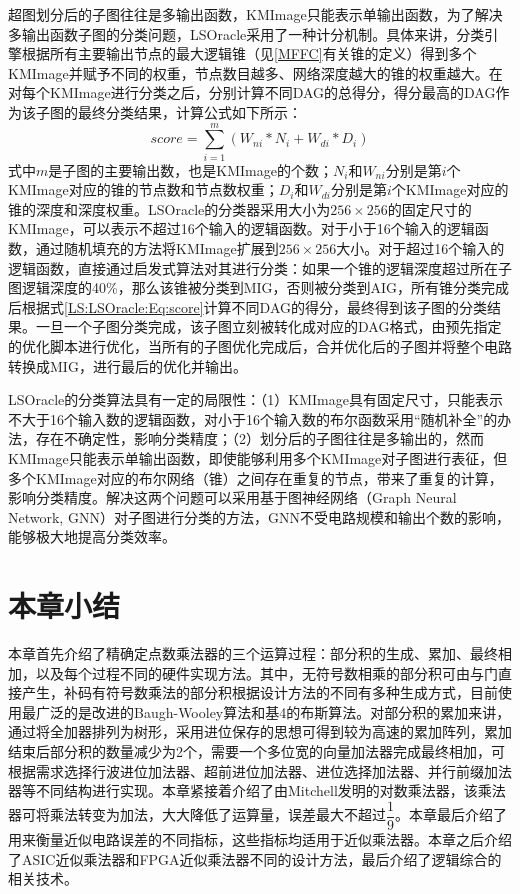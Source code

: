 超图划分后的子图往往是多输出函数，KMImage只能表示单输出函数，为了解决多输出函数子图的分类问题，LSOracle采用了一种计分机制。具体来讲，分类引擎根据所有主要输出节点的最大逻辑锥（见\ref{MFFC}有关锥的定义）得到多个KMImage并赋予不同的权重，节点数目越多、网络深度越大的锥的权重越大。在对每个KMImage进行分类之后，分别计算不同DAG的总得分，得分最高的DAG作为该子图的最终分类结果，计算公式如下所示：
\begin{equation}
\label{LS:LSOracle:Eq:score}
score = \sum_{i=1}^{m} ( W_{ni} * N_i +W_{di} *D_i )
\end{equation}
式中$m$是子图的主要输出数，也是KMImage的个数；$N_i$和$W_{ni}$分别是第$i$个KMImage对应的锥的节点数和节点数权重；$D_i$和$W_{di}$分别是第$i$个KMImage对应的锥的深度和深度权重。LSOracle的分类器采用大小为$256 \times 256$的固定尺寸的KMImage，可以表示不超过16个输入的逻辑函数。对于小于16个输入的逻辑函数，通过随机填充的方法将KMImage扩展到$256 \times 256$大小。对于超过16个输入的逻辑函数，直接通过启发式算法对其进行分类：如果一个锥的逻辑深度超过所在子图逻辑深度的40\%，那么该锥被分类到MIG，否则被分类到AIG，所有锥分类完成后根据式\eqref{LS:LSOracle:Eq:score}计算不同DAG的得分，最终得到该子图的分类结果。一旦一个子图分类完成，该子图立刻被转化成对应的DAG格式，由预先指定的优化脚本进行优化，当所有的子图优化完成后，合并优化后的子图并将整个电路转换成MIG，进行最后的优化并输出。

LSOracle的分类算法具有一定的局限性：（1）KMImage具有固定尺寸，只能表示不大于16个输入数的逻辑函数，对小于16个输入数的布尔函数采用“随机补全”的办法，存在不确定性，影响分类精度；（2）划分后的子图往往是多输出的，然而KMImage只能表示单输出函数，即使能够利用多个KMImage对子图进行表征，但多个KMImage对应的布尔网络（锥）之间存在重复的节点，带来了重复的计算，影响分类精度。解决这两个问题可以采用基于图神经网络（Graph Neural Network, GNN）对子图进行分类的方法，GNN不受电路规模和输出个数的影响，能够极大地提高分类效率。



\section{本章小结}

本章首先介绍了精确定点数乘法器的三个运算过程：部分积的生成、累加、最终相加，以及每个过程不同的硬件实现方法。其中，无符号数相乘的部分积可由与门直接产生，补码有符号数乘法的部分积根据设计方法的不同有多种生成方式，目前使用最广泛的是改进的Baugh-Wooley算法和基4的布斯算法。对部分积的累加来讲，通过将全加器排列为树形，采用进位保存的思想可得到较为高速的累加阵列，累加结束后部分积的数量减少为2个，需要一个多位宽的向量加法器完成最终相加，可根据需求选择行波进位加法器、超前进位加法器、进位选择加法器、并行前缀加法器等不同结构进行实现。本章紧接着介绍了由Mitchell发明的对数乘法器，该乘法器可将乘法转变为加法，大大降低了运算量，误差最大不超过$\dfrac{1}{9}$。本章最后介绍了用来衡量近似电路误差的不同指标，这些指标均适用于近似乘法器。本章之后介绍了ASIC近似乘法器和FPGA近似乘法器不同的设计方法，最后介绍了逻辑综合的相关技术。